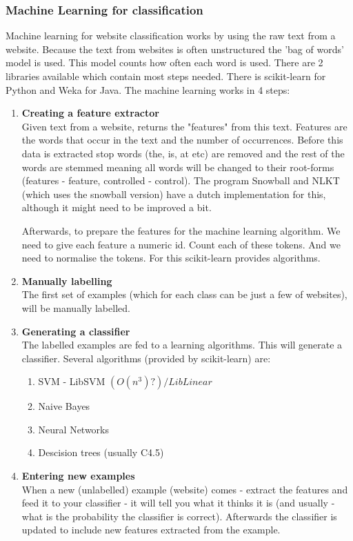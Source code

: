 \subsubsection{Machine Learning for classification}
Machine learning for website classification works by using the raw text from a website. Because the text from websites is often unstructured the 'bag of words' model is used. This model counts how often each word is used. There are 2 libraries available which contain most steps needed. There is scikit-learn \cite{scikit-learn} for Python and Weka \cite{weka} for Java.
The machine learning works in 4 steps:
\begin{enumerate}
    \item \textbf{Creating a feature extractor} \\
    Given text from a website, returns the "features" from this text. Features are the words that occur in the text and the number of occurrences. Before this data is extracted stop words (the, is, at etc) are removed and the rest of the words are stemmed meaning all words will be changed to their root-forms (features - feature, controlled - control). The program Snowball \cite{snowball_dutch} and NLKT \cite{nlkt_stemming} (which uses the snowball version) have a dutch implementation for this, although it might need to be improved a bit.
    
    Afterwards, to prepare the features for the machine learning algorithm. We need to give each feature a numeric id. Count each of these tokens. And we need to normalise the tokens. For this scikit-learn provides algorithms.
    \item \textbf{Manually labelling} \\
    The first set of examples (which for each class can be just a few of websites), will be manually labelled. %
    \item \textbf{Generating a classifier} \\
    The labelled examples are fed to a learning algorithms. This will generate a classifier. Several algorithms (provided by scikit-learn) are:
    \begin{enumerate}
        \item SVM - LibSVM $(O(n^3)?) / LibLinear$
        \item Naive Bayes
        \item Neural Networks
        \item Descision trees (usually C4.5)
    \end{enumerate}
    \item \textbf{Entering new examples} \\
    When a new (unlabelled) example (website) comes - extract the features and feed it to your classifier - it will tell you what it thinks it is (and usually - what is the probability the classifier is correct). Afterwards the classifier is updated to include new features extracted from the example.
\end{enumerate}

